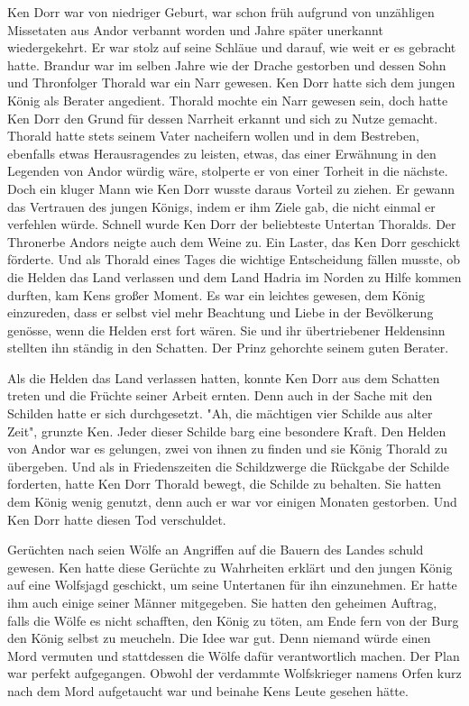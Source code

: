 \documentclass[10pt, a4paper, oneside]{book}
\begin{document}
\begin{multicols}{2}
Ken Dorr war von niedriger Geburt, war schon früh aufgrund von unzähligen Missetaten aus Andor verbannt worden und Jahre später unerkannt wiedergekehrt. Er war stolz auf seine Schläue und darauf, wie weit er es gebracht hatte. Brandur war im selben Jahre wie der Drache gestorben und dessen Sohn und Thronfolger Thorald war ein Narr gewesen. Ken Dorr hatte sich dem jungen König als Berater angedient. Thorald mochte ein Narr gewesen sein, doch hatte Ken Dorr den Grund für dessen Narrheit erkannt und sich zu Nutze gemacht. Thorald hatte stets seinem Vater nacheifern wollen und in dem Bestreben, ebenfalls etwas Herausragendes zu leisten, etwas, das einer Erwähnung in den Legenden von Andor würdig wäre, stolperte er von einer Torheit in die nächste. Doch ein kluger Mann wie Ken Dorr wusste daraus Vorteil zu ziehen. Er gewann das Vertrauen des jungen Königs, indem er ihm Ziele gab, die nicht einmal er verfehlen würde. Schnell wurde Ken Dorr der beliebteste Untertan Thoralds. Der Thronerbe Andors neigte auch dem Weine zu. Ein Laster, das Ken Dorr geschickt förderte. Und als Thorald eines Tages die wichtige Entscheidung fällen musste, ob die Helden das Land verlassen und dem Land Hadria im Norden zu Hilfe kommen durften, kam Kens großer Moment. Es war ein leichtes gewesen, dem König einzureden, dass er selbst viel mehr Beachtung und Liebe in der Bevölkerung genösse, wenn die Helden erst fort wären. Sie und ihr übertriebener Heldensinn stellten ihn ständig in den Schatten. Der Prinz gehorchte seinem guten Berater. 

Als die Helden das Land verlassen hatten, konnte Ken Dorr aus dem Schatten treten und die Früchte seiner Arbeit ernten. Denn auch in der Sache mit den Schilden hatte er sich durchgesetzt. "Ah, die mächtigen vier Schilde aus alter Zeit", grunzte Ken. Jeder dieser Schilde barg eine besondere Kraft. Den Helden von Andor war es gelungen, zwei von ihnen zu finden und sie König Thorald zu übergeben. Und als in Friedenszeiten die Schildzwerge die Rückgabe der Schilde forderten, hatte Ken Dorr Thorald bewegt, die Schilde zu behalten. Sie hatten dem König wenig genutzt, denn auch er war vor einigen Monaten gestorben. Und Ken Dorr hatte diesen Tod verschuldet. 

Gerüchten nach seien Wölfe an Angriffen auf die Bauern des Landes schuld gewesen. Ken hatte diese Gerüchte zu Wahrheiten erklärt und den jungen König auf eine Wolfsjagd geschickt, um seine Untertanen für ihn einzunehmen. Er hatte ihm auch einige seiner Männer mitgegeben. Sie hatten den geheimen Auftrag, falls die Wölfe es nicht schafften, den König zu töten, am Ende fern von der Burg den König selbst zu meucheln. Die Idee war gut. Denn niemand würde einen Mord vermuten und stattdessen die Wölfe dafür verantwortlich machen. Der Plan war perfekt aufgegangen. Obwohl der verdammte Wolfskrieger namens Orfen kurz nach dem Mord aufgetaucht war und beinahe Kens Leute gesehen hätte.


\end{multicols}
\end{document}
